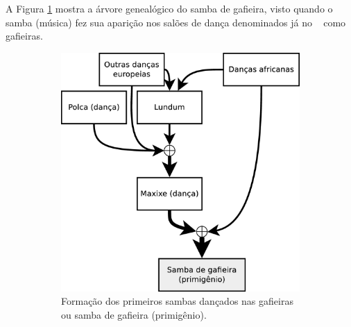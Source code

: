 A Figura \ref{fig:formuladosambagafieira} mostra a árvore genealógico do samba de gafieira,
visto quando o samba (música) fez sua aparição nos salões de dança denominados já no \AnoLivro~ como gafieiras.
\begin{figure}[h]
  \centering
  \begin{subfigure}[b]{0.52\textwidth}
    \centering
    \includegraphics[width=\textwidth]{chapters/cap-historia-sambagafieira/sambagafieiraformula.eps}
    \caption{Formação dos primeiros sambas dançados nas gafieiras ou samba de gafieira (primigênio).}
    \label{fig:formuladosambagafieira}
  \end{subfigure}
  ~~
  \begin{subfigure}[b]{0.37\textwidth}
    \centering

\end{subfigure}
\end{figure}
